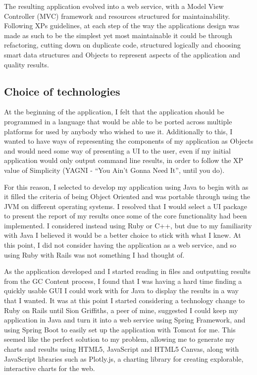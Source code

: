The resulting application evolved into a web service, with a Model View Controller (MVC) framework and resources structured for maintainability. Following XPs guidelines, at each step of the way the applications design was made as such to be the simplest yet most maintainable it could be through refactoring, cutting down on duplicate code, structured logically and choosing smart data structures and Objects to represent aspects of the application and quality results.

\subsection{Choice of technologies}
At the beginning of the application, I felt that the application should be programmed in a language that would be able to be ported across multiple platforms for used by anybody who wished to use it. Additionally to this, I wanted to have ways of representing the components of my application as Objects and would need some way of presenting a UI to the user, even if my initial application would only output command line results, in order to follow the XP value of Simplicity (YAGNI - ``You Ain't Gonna Need It'', until you do).

For this reason, I selected to develop my application using Java to begin with as it filled the criteria of being Object Oriented and was portable through using the JVM on different operating systems. I resolved that I would select a UI package to present the report of my results once some of the core functionality had been implemented. I considered instead using Ruby or C++, but due to my familiarity with Java I believed it would be a better choice to stick with what I knew. At this point, I did not consider having the application as a web service, and so using Ruby with Rails was not something I had thought of.

As the application developed and I started reading in files and outputting results from the GC Content process, I found that I was having a hard time finding a quickly usable GUI I could work with for Java to display the results in a way that I wanted. It was at this point I started considering a technology change to Ruby on Rails until Sion Griffiths, a peer of mine, suggested I could keep my application in Java and turn it into a web service using Spring Framework\cite{spring}, and using Spring Boot to easily set up the application with Tomcat for me\cite{springboot}. This seemed like the perfect solution to my problem, allowing me to generate my charts and results using HTML5, JavaScript and HTML5 Canvas, along with JavaScript libraries such as Plotly.js\cite{plotly}, a charting library for creating explorable, interactive charts for the web.


